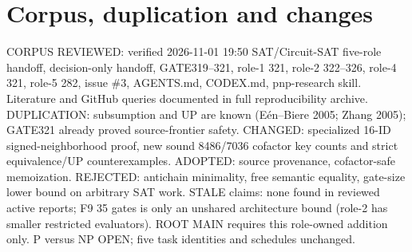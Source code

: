 \documentclass[11pt]{article}
\begin{document}
\section*{Corpus, duplication and changes}
CORPUS REVIEWED: verified 2026-11-01 19:50 SAT/Circuit-SAT five-role handoff, decision-only handoff, GATE319--321, role-1 321, role-2 322--326, role-4 321, role-5 282, issue \#3, AGENTS.md, CODEX.md, pnp-research skill. Literature and GitHub queries documented in full reproducibility archive. DUPLICATION: subsumption and UP are known (E\'en--Biere 2005; Zhang 2005); GATE321 already proved source-frontier safety. CHANGED: specialized 16-ID signed-neighborhood proof, new sound 8486/7036 cofactor key counts and strict equivalence/UP counterexamples. ADOPTED: source provenance, cofactor-safe memoization. REJECTED: antichain minimality, free semantic equality, gate-size lower bound on arbitrary SAT work. STALE claims: none found in reviewed active reports; F9 35 gates is only an unshared architecture bound (role-2 has smaller restricted evaluators). ROOT MAIN requires this role-owned addition only. P versus NP OPEN; five task identities and schedules unchanged.
\end{document}
